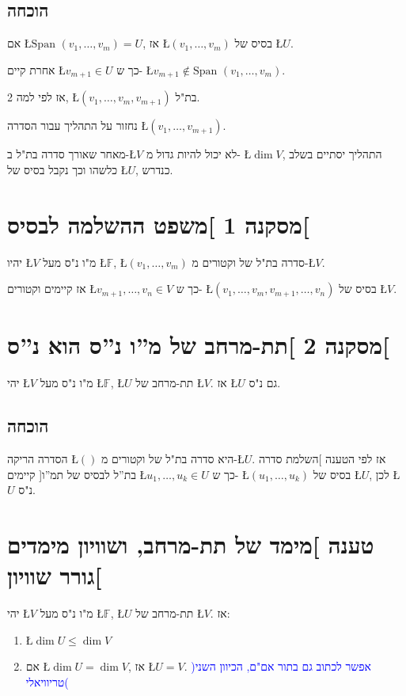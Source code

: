 \documentclass[english,hebrew]{article}
\newcommand{\spn}{\text{Span }}
\begin{document}
\subsection{הוכחה}

אם \L{$\spn(v_{1},\dots,v_{m})=U$}, אז \L{$(v_{1},\dots,v_{m})$}
בסיס של \L{$U$}. 

אחרת קיים \L{$v_{m+1}\in U$} כך ש- \L{$v_{m+1}\notin\spn(v_{1},\dots,v_{m})$}.

אז לפי למה 2, \L{$(v_{1},\dots,v_{m},v_{m+1})$} בת"ל.

נחזור על התהליך עבור הסדרה \L{$(v_{1},\dots,v_{m+1})$}.

מאחר שאורך סדרה בת"ל ב-\L{$V$} לא יכול להיות גדול מ- \L{$\dim V$},
התהליך יסתיים בשלב כלשהו וכך נקבל בסיס של \L{$U$}, כנדרש.

\section{מסקנה 1 {]}משפט ההשלמה לבסיס{[}}

יהיו \L{$V$} מ"ו נ"ס מעל \L{$\mathbb{F}$}, \L{$(v_{1},\dots,v_{m})$}
סדרה בת"ל של וקטורים מ-\L{$V$}.

אז קיימים וקטורים \L{$v_{m+1},\dots,v_{n}\in V$} כך ש- \L{$(v_{1},\dots,v_{m},v_{m+1},\dots,v_{n})$}
בסיס של \L{$V$}.

\section{מסקנה 2 {]}תת-מרחב של מ\textquotedblright ו נ\textquotedblright ס
הוא נ\textquotedblright ס{[}}

יהי \L{$V$} מ"ו נ"ס מעל \L{$\mathbb{F}$}, \L{$U$} תת-מרחב של
\L{$V$}. אז \L{$U$} גם נ"ס.

\subsection{הוכחה}

הסדרה הריקה \L{$()$} היא סדרה בת"ל של וקטורים מ-\L{$U$}. אז לפי
הטענה {]}השלמת סדרה בת\textquotedblright ל לבסיס של תמ\textquotedblright ו{[}
קיימים \L{$u_{1},\dots,u_{k}\in U$} כך ש- \L{$(u_{1},\dots,u_{k})$}
בסיס של \L{$U$}, לכן \L{$U$} נ"ס.

\section{טענה {]}מימד של תת-מרחב, ושוויון מימדים גורר שוויון{[}}

יהי \L{$V$} מ"ו נ"ס מעל \L{$\mathbb{F}$}, \L{$U$} תת-מרחב של
\L{$V$}. אז: 
\begin{enumerate}
\item \L{$\dim U\le\dim V$} 
\item אם \L{$\dim U=\dim V$}, אז \L{$U=V$}. \textcolor{blue}{)אפשר לכתוב
גם בתור אם"ם, הכיוון השני טריוויאלי( }
\end{enumerate}
\end{document}
